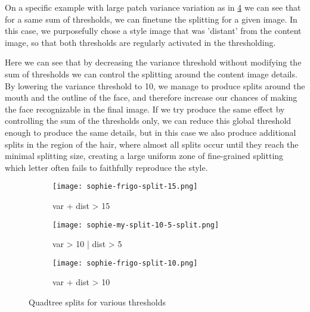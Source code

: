 \documentclass[a4paper]{article}
\begin{document}
On a specific example with large patch variance variation as in \ref{fig:splits-various-thres-sophie} we can see that for a same sum of thresholds, we can finetune the splitting for a given image. In this case, we purposefully chose a style image that was 'distant' from the content image, so that both thresholds are regularly activated in the thresholding.

Here we can see that by decreasing the variance threshold without modifying the sum of thresholds we can control the splitting around the content image details. By lowering the variance threshold to 10, we manage to produce splits around the mouth and the outline of the face, and therefore increase our chances of making the face recognizable in the final image. If we try produce the same effect by controlling the sum of the thresholds only, we can reduce this global threshold enough to produce the same details, but in this case we also produce additional splits in the region of the hair, where almost all splits occur until they reach the minimal splitting size, creating a large uniform zone of fine-grained splitting which letter often fails to faithfully reproduce the style.  



\begin{figure}[!h]
\centering
\begin{subfigure}{.32\textwidth}
  \centering
  \texttt{[image: sophie-frigo-split-15.png]}
  \caption{\label{fig:sophie-frigo-split-15}var + dist > 15 }
\end{subfigure}
\begin{subfigure}{.32\textwidth}
  \centering
  \texttt{[image: sophie-my-split-10-5-split.png]}
  \caption{\label{fig:sophie-my-split-10-5-split}var > 10 | dist > 5}
\end{subfigure}
\begin{subfigure}{.32\textwidth}
  \centering
  \texttt{[image: sophie-frigo-split-10.png]}
  \caption{\label{fig:sophie-frigo-split-10}var + dist > 10}
\end{subfigure}
\caption{Quadtree splits for various thresholds }
\label{fig:splits-various-thres-sophie}
\end{figure}
\end{document}
